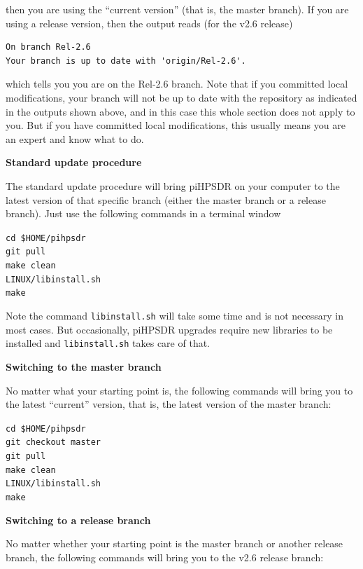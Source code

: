 \documentclass[12pt]{book}
\def\grtt#1{\texttt{\color{magenta}#1}}
\def\pH{pi\-HPSDR\xspace}
\begin{document}
then you are using the ``current version'' (that is, the master branch). If you are using a release
version, then the output reads (for the v2.6 release)

\begin{verbatim}
On branch Rel-2.6
Your branch is up to date with 'origin/Rel-2.6'.
\end{verbatim}

which tells you you are on the Rel-2.6 branch. Note that if you committed local modifications,
your branch will not be up to date with the repository as indicated in the outputs shown above,
and in this case this whole section does  not apply  to you. But if you have committed  local
modifications, this usually means you are an expert and know what to do.

\clearpage
\textbf{Standard update procedure}

The standard update procedure will bring \pH on your computer to the latest version of
that specific branch (either the master branch or a release branch).
Just use the following commands in a terminal window

\grtt{cd \$HOME/pihpsdr} \\
\grtt{git pull} \\
\grtt{make clean} \\
\grtt{LINUX/libinstall.sh} \\
\grtt{make}

Note the command \texttt{libinstall.sh} will take some time and is not necessary in most cases. But occasionally,
\pH upgrades require new libraries to be installed and \texttt{libinstall.sh} takes care of that.

\medskip
\textbf{Switching to the master branch}

No matter what your starting point is, the following commands will bring you to the
latest ``current'' version, that is, the latest version of the master branch:

\grtt{cd \$HOME/pihpsdr} \\
\grtt{git checkout master} \\
\grtt{git pull} \\
\grtt{make clean} \\
\grtt{LINUX/libinstall.sh} \\
\grtt{make}

\medskip
\textbf{Switching to a release branch}

No matter whether your starting point is the master branch or another release branch, the following
commands will bring you to  the v2.6 release branch:
\end{document}

